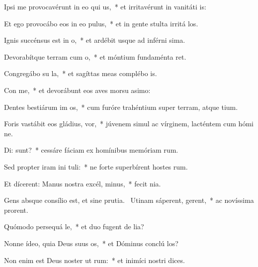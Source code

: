 \item Ipsi me provocavérunt in eo qui   us,~* et irritavérunt in vanitáti is:
\item Et ego provocábo eos in eo    pulus,~* et in gente stulta irritá los.
\item Ignis succénsus est in  o,~* et ardébit usque ad inférni sima.
\item Devorabítque terram cum  o,~* et móntium fundaménta ret.
\item Congregábo su  la,~* et sagíttas meas complébo  is.
\item Con me,~* et devorábunt eos aves morsu asimo:
\item Dentes bestiárum im  os,~* cum furóre trahéntium super terram, atque tium.
\item Foris vastábit eos gládius,   vor,~* júvenem simul ac vírginem, lacténtem cum hómi ne.
\item Di:  sunt?~* cessáre fáciam ex homínibus memóriam rum.
\item Sed propter iram ini tuli:~* ne forte superbírent hostes rum.
\item Et dícerent: Manus nostra excél,   minus,~* fecit  nia.
\item Gens absque consílio est, et sine prutia.~\pscross{} Utinam sáperent,  gerent,~* ac novíssima prorent.
\item Quómodo persequá  le,~* et duo fugent de lia?
\item Nonne ídeo, quia Deus suus  os,~* et Dóminus conclú los?
\item Non enim est Deus noster ut  rum:~* et inimíci nostri  dices.
